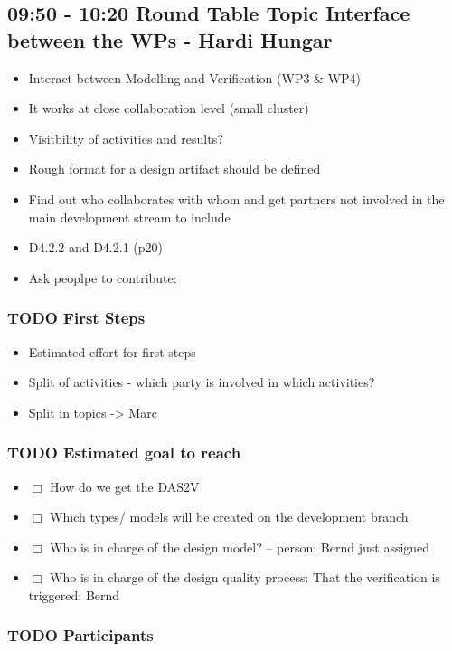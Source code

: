\documentclass[a4paper,german]{article}
\begin{document}
\subsection{09:50 - 10:20 Round Table Topic Interface between the WPs - Hardi Hungar}
\label{sec-1-2}

\begin{itemize}
\item Interact between Modelling and Verification (WP3 \& WP4)
\item It works at close collaboration level (small cluster)
\item Visitbility of activities and results?
\item Rough format for a design artifact should be defined
\item Find out who collaborates with whom and get partners not involved
       in the main development stream to include
\item D4.2.2 and D4.2.1 (p20)
\item Ask peoplpe to contribute:
\end{itemize}
\subsubsection{\textbf{TODO} First Steps}
\label{sec-1-2-1}

\begin{itemize}
\item Estimated effort for first steps
\item Split of activities - which party is involved in which activities?
\item Split in topics -> Marc
\end{itemize}
\subsubsection{\textbf{TODO} Estimated goal to reach}
\label{sec-1-2-2}

\begin{itemize}
\item $\Box$ How do we get the DAS2V
\item $\Box$ Which types/ models will be created on the development branch
\item $\Box$ Who is in charge of the design model? -- person: Bernd just assigned
\item $\Box$ Who is in charge of the design quality process: That the verification is triggered: Bernd
\end{itemize}
\subsubsection{\textbf{TODO} Participants}
\label{sec-1-2-3}
\end{document}
